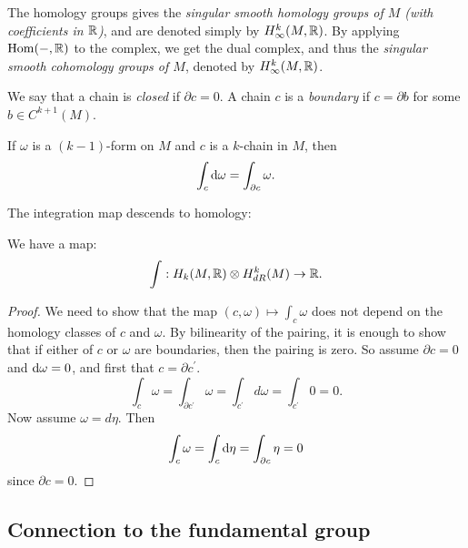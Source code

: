 \documentclass[11pt, english]{article}
\begin{document}
The homology groups gives the \emph{singular smooth  homology groups of $M$ (with coefficients in $\mathbb{R}$)}, and are denoted simply by $H_{\infty}^k(M,\mathbb{R})$. By applying $\operatorname{Hom}(-,\mathbb{R})$ to the complex, we get the dual complex, and thus the \emph{singular smooth cohomology groups of $M$}, denoted by $H_{\infty}^k(M,\mathbb{R})$.

We say that a chain is \emph{closed} if $\partial c =0$. A chain $c$ is a \emph{boundary} if $c=\partial b$ for some $b \in C^{k+1}(M)$.

\begin{thm}
  If $\omega$ is a $(k-1)$-form on $M$ and $c$ is a $k$-chain in $M$, then
\[
\int_c \mathrm{d}{\omega} = \int_{\partial c} \omega.
\]
\end{thm}

The integration map descends to homology:
\begin{prop}
We have a map:
\[
\int: H_k(M,\mathbb{R}) \otimes H_{dR}^k(M) \to \mathbb{R}.
\]
\end{prop}
\begin{proof}
We need to show that the map $(c,\omega) \mapsto \int_c \omega$ does not depend on the homology classes of $c$ and $\omega$. By bilinearity of the pairing, it is enough to show that if either of $c$ or $\omega$ are boundaries, then the pairing is zero. So assume $\partial c =0$ and $\mathrm{d}{\omega} = 0$, and first that $c = \partial c^\prime$.
\[
\int_c \omega = \int_{\partial c^\prime} \omega = \int_{c^\prime} d \omega = \int_{c ^\prime} 0 = 0.
\]
Now assume $\omega = d \eta$. Then
\[
\int_c \omega = \int_c \mathrm{d}{\eta} = \int_{\partial c} \eta = 0
\]
since $\partial c = 0$. 
\end{proof}

\subsection{Connection to the fundamental group}
\end{document}
